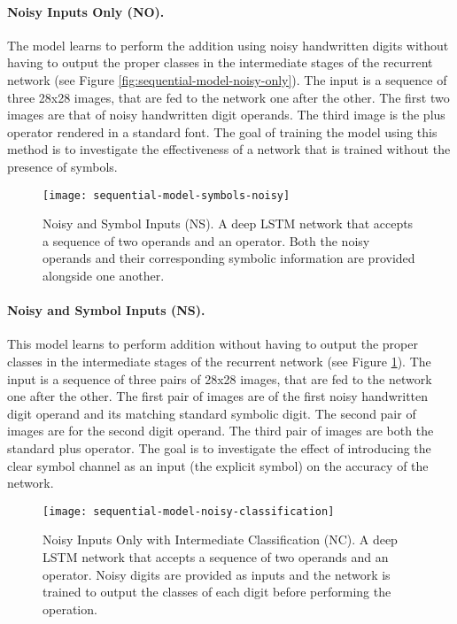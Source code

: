 \paragraph{Noisy Inputs Only (NO).} The model learns to perform the addition using noisy handwritten digits without having to output the proper classes in the intermediate stages of the recurrent network (see Figure \ref{fig:sequential-model-noisy-only}). The input is a sequence of three 28x28 images, that are fed to the network one after the other. The first two images are that of noisy handwritten digit operands. The third image is the plus operator rendered in a standard font.  The goal of training the model using this method is to investigate the effectiveness of a network that is trained without the presence of symbols.

\begin{figure}[t]
	\centering
	\texttt{[image: sequential-model-symbols-noisy]}
	\caption{Noisy and Symbol Inputs (NS). A deep LSTM network that accepts a sequence of two operands and an operator. Both the noisy operands and their corresponding symbolic information are provided alongside one another.}
	\label{fig:sequential-model-symbols-noisy}
\end{figure}

\paragraph{Noisy and Symbol Inputs (NS).} This model learns to perform addition without having to output the proper classes in the intermediate stages of the recurrent network (see Figure \ref{fig:sequential-model-symbols-noisy}). The input is a sequence of three pairs of 28x28 images, that are fed to the network one after the other. The first pair of images are of the first noisy handwritten digit operand and its matching standard symbolic digit. The second pair of images are for the second digit operand. The third pair of images are both the standard plus operator. The goal is to investigate the effect of introducing the clear symbol channel as an input (the explicit symbol) on the accuracy of the network.

\begin{figure}[t]
	\centering
	\texttt{[image: sequential-model-noisy-classification]}
	\caption{Noisy Inputs Only with Intermediate Classification (NC). A deep LSTM network that accepts a sequence of two operands and an operator. Noisy digits are provided as inputs and the network is trained to output the classes of each digit before performing the operation.}
	\label{fig:sequential-model-noisy-classification}
\end{figure}

